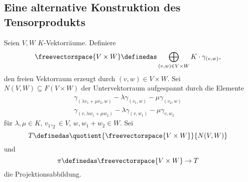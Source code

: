\subsection*{Eine alternative Konstruktion des Tensorprodukts}
Seien \( V,W \) \( K \)-Vektorräume. Definiere
\begin{equation*}
  \freevectorspace{V\times W}\definedas \bigoplus_{(v,w)\in V\times W}K\cdot \gamma_{(v,w)},
\end{equation*}
den freien Vektorraum erzeugt durch \( (v,w)\in V\times W \). Sei \( N(V,W)\subseteq F(V\times W) \) der Untervektorraum aufgespannt durch die Elemente
\begin{gather*}
  \gamma_{(\lambda v_1+\mu v_2,w)}-\lambda \gamma_{(v_1,w)}-\mu \gamma_{(v_2,w)}\\
  \gamma_{(v,\lambda w_1+\mu w_2)}-\lambda \gamma_{(v,w_1)}-\mu \gamma_{v,w_2}
\end{gather*}
für \( \lambda,\mu\in K \), \( v_1,_2\in V \), \( w,w_1+w_2\in W \). Sei
\begin{equation*}
  T\definedas\quotient{\freevectorspace{V\times W}}{N(V,W)}
\end{equation*}
und
\begin{equation*}
  \pi \definedas \freevectorspace{V\times W}\to T
\end{equation*}
die Projektionsabbildung.

